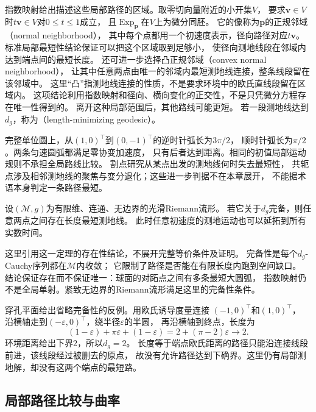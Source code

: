 指数映射给出描述这些局部路径的区域。取零切向量附近的小开集$V$，
要求$\bm v\in V$时$t\bm v\in V$对$0\leq t\leq1$成立，
且$\operatorname{Exp}_{\bm p}$在$V$上为微分同胚。
它的像称为$\bm p$的正规邻域（normal neighborhood），
其中每个点都用一个初速度表示，径向路径对应$t\bm v$。
标准局部最短性结论保证可以把这个区域取到足够小，
使径向测地线段在邻域内达到端点间的最短长度。
还可进一步选择凸正规邻域（convex normal neighborhood），
让其中任意两点由唯一的邻域内最短测地线连接，整条线段留在该邻域中。
这里“凸”指测地线连接的性质，不是要求环境中的欧氏直线段留在区域内。
这项结论利用指数映射和径向、横向变化的正交性，不是只凭微分方程存在唯一性得到的。
离开这种局部范围后，其他路线可能更短。
若一段测地线达到$d_g$，称为（length-minimizing geodesic）。

完整单位圆上，从$(1,0)^\top$到$(0,-1)^\top$的逆时针弧长为$3\pi/2$，
顺时针弧长为$\pi/2$。两条匀速圆弧都满足零协变加速度，
只有后者达到距离。相同的初值局部运动规则不承担全局路线比较。
割点研究从某点出发的测地线何时失去最短性，
共轭点涉及相邻测地线的聚焦与变分退化；这些进一步判据不在本章展开，
不能据术语本身判定一条路径最短。

\begin{theorem}
\label{thm:geometry-hopf-rinow-existence}
设$(\mathcal M,g)$为有限维、连通、无边界的光滑Riemann流形。
若它关于$d_g$完备，则任意两点之间存在长度最短测地线。
此时任意初速度的测地运动也可以延拓到所有实数时间。
\end{theorem}
这里引用这一定理的存在性结论，不展开完整等价条件及证明。
完备性是每个$d_g$-Cauchy序列都在$\mathcal M$内收敛；
它限制了路径是否能在有限长度内跑到空间缺口。
结论保证存在而不保证唯一：球面的对跖点之间有多条最短大圆弧，
指数映射仍不是全局单射。紧致无边界的Riemann流形满足这里的完备性条件。

穿孔平面给出省略完备性的反例。用欧氏诱导度量连接
$(-1,0)^\top$和$(1,0)^\top$，
沿横轴走到$(-\varepsilon,0)^\top$，绕半径$\varepsilon$的半圆，
再沿横轴到终点，长度为
\[
 (1-\varepsilon)+\pi\varepsilon+(1-\varepsilon)
 =2+(\pi-2)\varepsilon\longrightarrow2.
\]
环境距离给出下界$2$，所以$d_g=2$。
长度等于端点欧氏距离的路径只能沿连接线段前进，该线段经过被删去的原点，
故没有允许路径达到下确界。这里仍有局部测地解，却没有这两个端点的最短路。

\subsection{局部路径比较与曲率}
\label{sec:geometry-riemannian-curvature}

